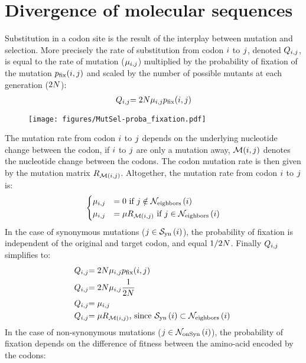 \section{Divergence of molecular sequences}
Substitution in a codon site is the result of the interplay between mutation and selection.
More precisely the rate of substitution from codon ${i}$ to ${j}$, denoted $Q_{{i}, {j}}$, is equal to the rate of mutation ($\mu_{{i}, {j}}$) multiplied by the probability of fixation of the mutation $p_{\mathrm{fix}}({i}, {j})$ and scaled by the number of possible mutants at each generation ($2N$):
\begin{align}
{Q_{{i}, {j}}} & { = 2 N \mu_{{i}, {j}}  p_{\mathrm{fix}}}({i}, {j}) \\
\end{align}
\begin{figure}[thbp]
	\centering
	\texttt{[image: figures/MutSel-proba\_fixation.pdf]}
\end{figure}
The mutation rate from codon ${i}$ to ${j}$ depends on the underlying nucleotide change between the codon, if ${i}$ to ${j}$ are only a mutation away, $\mathcal{M}({i}, {j})$ denotes the nucleotide change between the codons. The codon mutation rate is then given by the mutation matrix ${R_{\mathcal{M}({i}, {j})}}$. Altogether, the mutation rate from codon ${i}$ to ${j}$ is:
\begin{equation}
\begin{dcases}
\mu_{{i}, {j}} & = 0 \text{ if } {j} \notin \mathcal{N}_{\mathrm{eighbors}}\left({i}\right) \\
\mu_{{i}, {j}} & = \mu R_{\mathcal{M}({i}, {j})} \text{ if } {j} \in \mathcal{N}_{\mathrm{eighbors}}\left({i}\right)
\end{dcases}
\end{equation}
In the case of synonymous mutations (${j} \in \mathcal{S}_{\mathrm{yn}}\left({i}\right) $), the probability of fixation is independent of the original and target codon, and equal $1/2 N$. Finally ${Q_{{i}, {j}}}$ simplifies to: 
\begin{align}
{Q_{{i}, {j}}} & { = 2 N \mu_{{i}, {j}}  p_{\mathrm{fix}}}({i}, {j}) \nonumber \\
{Q_{{i}, {j}}} & { = 2 N \mu_{{i}, {j}} \dfrac{1}{2N}} \nonumber \\
{Q_{{i}, {j}}} & { =  \mu_{{i}, {j}} } \nonumber \\
{Q_{{i}, {j}}} & { =  \mu R_{\mathcal{M}({i}, {j})} }\text{, since } \mathcal{S}_{\mathrm{yn}}\left({i}\right) \subset \mathcal{N}_{\mathrm{eighbors}}\left({i}\right) \
\end{align}
In the case of non-synonymous mutations (${j} \in \mathcal{N}_{\mathrm{onSyn}}\left({i}\right) $), the probability of fixation depends on the difference of fitness between the amino-acid encoded by the codons:

